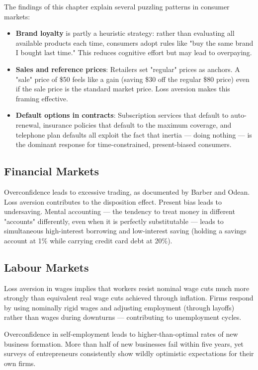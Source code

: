 \documentclass[12pt, letterpaper]{article}
\begin{document}
The findings of this chapter explain several puzzling patterns in consumer markets:

\begin{itemize}
\item \textbf{Brand loyalty} is partly a heuristic strategy: rather than evaluating all available products each time, consumers adopt rules like "buy the same brand I bought last time." This reduces cognitive effort but may lead to overpaying.
\item \textbf{Sales and reference prices}: Retailers set "regular" prices as anchors. A "sale" price of \$50 feels like a gain (saving \$30 off the regular \$80 price) even if the sale price is the standard market price. Loss aversion makes this framing effective.
\item \textbf{Default options in contracts}: Subscription services that default to auto-renewal, insurance policies that default to the maximum coverage, and telephone plan defaults all exploit the fact that inertia --- doing nothing --- is the dominant response for time-constrained, present-biased consumers.
\end{itemize}


\subsection{Financial Markets}


Overconfidence leads to excessive trading, as documented by Barber and Odean. Loss aversion contributes to the disposition effect. Present bias leads to undersaving. Mental accounting --- the tendency to treat money in different "accounts" differently, even when it is perfectly substitutable --- leads to simultaneous high-interest borrowing and low-interest saving (holding a savings account at 1\% while carrying credit card debt at 20\%).


\subsection{Labour Markets}


Loss aversion in wages implies that workers resist nominal wage cuts much more strongly than equivalent real wage cuts achieved through inflation. Firms respond by using nominally rigid wages and adjusting employment (through layoffs) rather than wages during downturns --- contributing to unemployment cycles.

Overconfidence in self-employment leads to higher-than-optimal rates of new business formation. More than half of new businesses fail within five years, yet surveys of entrepreneurs consistently show wildly optimistic expectations for their own firms.
\end{document}
